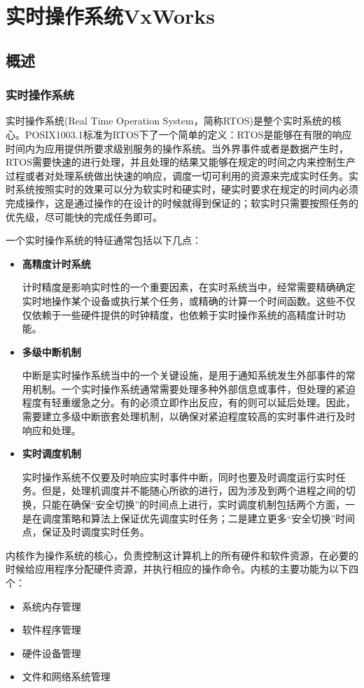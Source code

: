 \chapter{实时操作系统VxWorks}

\section{概述}

\subsection{实时操作系统}
	实时操作系统(Real Time Operation System，简称RTOS)是整个实时系统的核心。POSIX1003.1标准为RTOS下了一个简单的定义：RTOS是能够在有限的响应时间内为应用提供所要求级别服务的操作系统\cite{Renard20081003}。当外界事件或者是数据产生时，RTOS需要快速的进行处理，并且处理的结果又能够在规定的时间之内来控制生产过程或者对处理系统做出快速的响应，调度一切可利用的资源来完成实时任务。实时系统按照实时的效果可以分为软实时和硬实时，硬实时要求在规定的时间内必须完成操作，这是通过操作的在设计的时候就得到保证的；软实时只需要按照任务的优先级，尽可能快的完成任务即可。

一个实时操作系统的特征通常包括以下几点：
\begin{itemize}
\item \textbf{高精度计时系统} 

	计时精度是影响实时性的一个重要因素，在实时系统当中，经常需要精确确定实时地操作某个设备或执行某个任务，或精确的计算一个时间函数。这些不仅仅依赖于一些硬件提供的时钟精度，也依赖于实时操作系统的高精度计时功能。
\item \textbf{多级中断机制}

	中断是实时操作系统当中的一个关键设施，是用于通知系统发生外部事件的常用机制。一个实时操作系统通常需要处理多种外部信息或事件，但处理的紧迫程度有轻重缓急之分。有的必须立即作出反应，有的则可以延后处理。因此，需要建立多级中断嵌套处理机制，以确保对紧迫程度较高的实时事件进行及时响应和处理。
\item \textbf{实时调度机制} 

	实时操作系统不仅要及时响应实时事件中断，同时也要及时调度运行实时任务。但是，处理机调度并不能随心所欲的进行，因为涉及到两个进程之间的切换，只能在确保“安全切换”的时间点上进行，实时调度机制包括两个方面，一是在调度策略和算法上保证优先调度实时任务；二是建立更多“安全切换”时间点，保证及时调度实时任务。
\end{itemize}

	内核作为操作系统的核心，负责控制这计算机上的所有硬件和软件资源，在必要的时候给应用程序分配硬件资源，并执行相应的操作命令。内核的主要功能为以下四个：
\begin{itemize}
\item 系统内存管理
\item 软件程序管理
\item 硬件设备管理
\item 文件和网络系统管理
\end{itemize}

